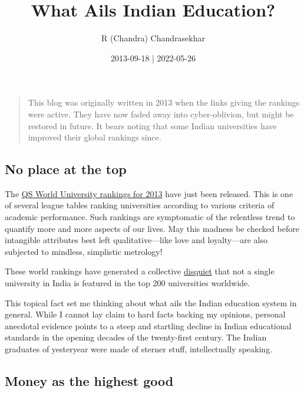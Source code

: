 \documentclass[
  a4paper,
]{article}
\title{What Ails Indian Education?}
\author{R (Chandra) Chandrasekhar}
\date{2013-09-18 | 2022-05-26}
\begin{document}
\maketitle

\thispagestyle{empty}


\begin{quote}
This blog was originally written in 2013 when the links giving the
rankings were active. They have now faded away into cyber-oblivion, but
might be restored in future. It bears noting that some Indian
universities have improved their global rankings since.
\end{quote}

\hypertarget{no-place-at-the-top}{%
\subsection{No place at the top}\label{no-place-at-the-top}}

The
\href{http://www.topuniversities.com/university-rankings/world-university-rankings/2013\#sorting=rank+region=+country=+faculty=+stars=false+search=}{QS
World University rankings for 2013} have just been released. This is one
of several league tables ranking universities according to various
criteria of academic performance. Such rankings are symptomatic of the
relentless trend to quantify more and more aspects of our lives. May
this madness be checked before intangible attributes best left
qualitative---like love and loyalty---are also subjected to mindless,
simplistic metrology!

These world rankings have generated a collective
\href{http://articles.timesofindia.indiatimes.com/2013-09-11/news/41969629_1_qs-world-university-rankings-mumbai-university-indian}{disquiet}
that not a single university in India is featured in the top 200
universities worldwide.

This topical fact set me thinking about what ails the Indian education
system in general. While I cannot lay claim to hard facts backing my
opinions, personal anecdotal evidence points to a steep and startling
decline in Indian educational standards in the opening decades of the
twenty-first century. The Indian graduates of yesteryear were made of
sterner stuff, intellectually speaking.

\hypertarget{money-as-the-highest-good}{%
\subsection{Money as the highest good}\label{money-as-the-highest-good}}
\end{document}
